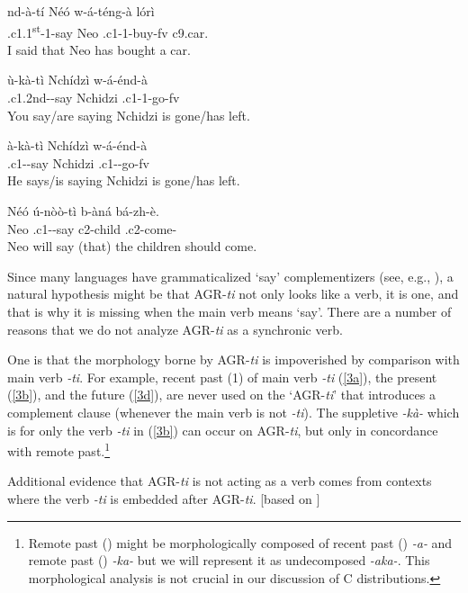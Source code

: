 \documentclass[output=paper,
modfonts
]{langscibook}
\begin{document}
\ea \label{3}
\ea\label{3a} \gll nd-à-tí Néó w-á-téng-à	lórì \\
	.c1.1\textsuperscript{st}-1-say	Neo	.c1-1-buy-fv		c9.car.\\ 
	\glt I said that Neo has bought a car.

\ex\label{3b}  \gll	ù-kà-tì			Nchídzì	w-á-énd-à \\
     	.c1.2nd--say	Nchidzi	.c1-1-go-fv \\
	\glt You say/are saying  Nchidzi is gone\slash has left.

\ex\label{3c}    \gll à-kà-tì			Nchídzì	w-á-énd-à \\
      	.c1--say	Nchidzi	.c1--go-fv \\
     	\glt He says/is saying Nchidzi is gone\slash has left. 

\ex\label{3d}  \gll Néó	ú-nòò-tì		b-àná		bá-zh-è.\\
	Neo	.c1--say	c2-child	.c2-come-\\
	\glt Neo will say (that) the children should come.

\z
\z 

Since many languages have grammaticalized `say' complementizers (see, e.g., \citealt{Heine2002}), a natural hypothesis might be that AGR-\textit{ti} not only looks like a verb, it is one, and that is why it is missing when the main verb means `say'. There are a number of reasons that we do not analyze AGR-\textit{ti} as a synchronic verb. 

One is that the morphology borne by AGR-\textit{ti} is impoverished by comparison with main verb \textit{-ti}. For example,  recent past (1) of main verb \textit{-ti} (\ref{3a}), the present (\ref{3b}), and the future (\ref{3d}),  are never used on the ‘AGR-\textit{ti}’ that introduces a complement clause (whenever the main verb is not \textit{-ti}). The suppletive \textit{-kà-} which is  for only the verb \textit{-ti} in (\ref{3b})   can occur on AGR-\textit{ti}, but only in concordance with remote past.\footnote{Remote past () might be morphologically composed of recent past () \textit{-a-} and remote past () \textit{-ka-} but we will represent it as undecomposed \textit{-aka-}. This morphological analysis is not crucial in our discussion of C distributions.}  

Additional evidence that AGR-\textit{ti} is not acting as a verb comes from contexts where the verb \textit{-ti} is embedded after AGR-\textit{ti}. [based on \citealt[ID559]{AfranaphDatabaseOngoing}]
\end{document}
